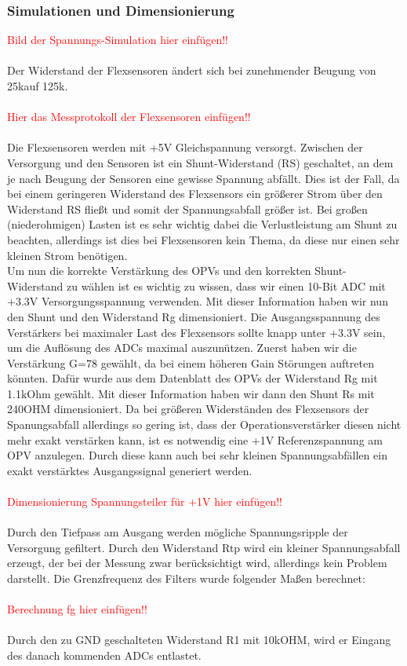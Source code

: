 \documentclass[11pt]{article}
\begin{document}
\subsubsection{Simulationen und Dimensionierung}
\textcolor{red}{Bild der Spannungs-Simulation hier einfügen!!}\\
\\
Der Widerstand der Flexsensoren ändert sich bei zunehmender Beugung von 25k\textOmega auf 125k\textOmega.\\
\\
\textcolor{red}{Hier das Messprotokoll der Flexsensoren einfügen!!}\\
\\
Die Flexsensoren werden mit +5V Gleichspannung versorgt. Zwischen der Versorgung und den Sensoren ist ein Shunt-Widerstand 
(RS) geschaltet, an dem je nach Beugung der Sensoren eine gewisse Spannung abfällt. Dies ist der Fall, da bei einem 
geringeren Widerstand des Flexsensors ein größerer Strom über den Widerstand RS fließt und somit der Spannungsabfall größer 
ist. Bei großen (niederohmigen) Lasten ist es sehr wichtig dabei die Verlustleistung am Shunt zu beachten, allerdings ist 
dies bei Flexsensoren kein Thema, da diese nur einen sehr kleinen Strom benötigen.
\\
Um nun die korrekte Verstärkung des OPVs und den korrekten Shunt-Widerstand zu wählen ist es wichtig zu wissen, dass wir 
einen 10-Bit ADC mit +3.3V Versorgungsspannung verwenden. Mit dieser Information haben wir nun den Shunt und den Widerstand 
Rg dimensioniert. Die Ausgangsspannung des Verstärkers bei maximaler Last des Flexsensors sollte knapp unter +3.3V sein, 
um die Auflösung des ADCs maximal auszunützen. Zuerst haben wir die Verstärkung G=78 gewählt, da bei einem höheren Gain 
Störungen auftreten könnten. Dafür wurde aus dem Datenblatt des OPVs der Widerstand Rg mit 1.1kOhm gewählt. Mit dieser 
Information haben wir dann den Shunt Rs mit 240OHM dimensioniert. Da bei größeren Widerständen des Flexsensors der 
Spanungsabfall allerdings so gering ist, dass der Operationsverstärker diesen nicht mehr exakt verstärken kann, ist es 
notwendig eine +1V Referenzspannung am OPV anzulegen. Durch diese kann auch bei sehr kleinen Spannungsabfällen ein exakt 
verstärktes Ausgangssignal generiert werden.\\
\\
\textcolor{red}{Dimensionierung Spannungsteiler für +1V hier einfügen!!}\\
\\
Durch den Tiefpass am Ausgang werden mögliche Spannungsripple der Versorgung gefiltert. Durch den Widerstand Rtp wird 
ein kleiner Spannungsabfall erzeugt, der bei der Messung zwar berücksichtigt wird, allerdings kein Problem darstellt. 
Die Grenzfrequenz des Filters wurde folgender Maßen berechnet:\\
\\
\textcolor{red}{Berechnung fg hier einfügen!!}\\
\\
Durch den zu GND geschalteten Widerstand R1 mit 10kOHM, wird er Eingang des danach kommenden ADCs entlastet. 
\end{document}
